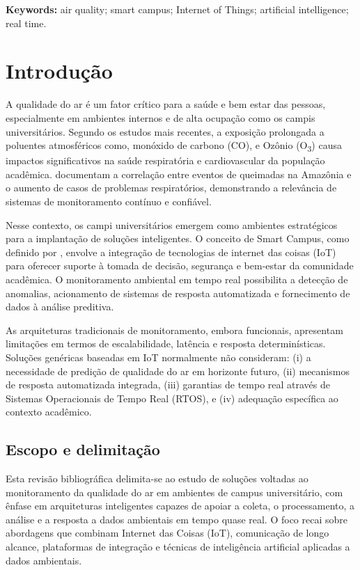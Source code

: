 \documentclass[12pt,a4paper]{article}
\begin{document}
\textbf{Keywords:} air quality; smart campus; Internet of Things; artificial intelligence; real time.

\section{Introdução}

A qualidade do ar é um fator crítico para a saúde e bem estar das pessoas, especialmente em ambientes internos e de alta ocupação como os campis 
universitários. Segundo os estudos mais recentes, a exposição prolongada a poluentes atmosféricos como, monóxido de carbono (CO), e Ozônio (O\textsubscript{3})
causa impactos significativos na saúde respiratória e cardiovascular da população acadêmica. \cite{gomes2024} documentam a correlação entre eventos
de queimadas na Amazônia e o aumento de casos de problemas respiratórios, demonstrando a relevância de sistemas de monitoramento contínuo e confiável.

Nesse contexto, os campi universitários emergem como ambientes estratégicos para a implantação de soluções inteligentes. O conceito de Smart Campus, 
como definido por \cite{minallah2020}, envolve a integração de tecnologias de internet das coisas (IoT) para oferecer suporte à tomada de decisão, segurança e 
bem-estar da comunidade acadêmica. O monitoramento ambiental em tempo real possibilita a detecção de anomalias, acionamento de sistemas de resposta automatizada e fornecimento
de dados à análise preditiva.

As arquiteturas tradicionais de monitoramento, embora funcionais, apresentam limitações em termos de escalabilidade, latência e resposta determinísticas.
Soluções genéricas baseadas em IoT \cite{mokrani2019,kumar2017} normalmente não consideram: (i) a necessidade de predição de qualidade do ar em horizonte futuro, 
(ii) mecanismos de resposta automatizada integrada, (iii) garantias de tempo real através de Sistemas Operacionais de Tempo Real (RTOS), e 
(iv) adequação específica ao contexto acadêmico.

\subsection{Escopo e delimitação}
Esta revisão bibliográfica delimita-se ao estudo de soluções voltadas ao monitoramento da qualidade do ar em ambientes de campus universitário, 
com ênfase em arquiteturas inteligentes capazes de apoiar a coleta, o processamento, a análise e a resposta a dados ambientais em tempo quase real. 
O foco recai sobre abordagens que combinam Internet das Coisas (IoT), comunicação de longo alcance, plataformas de integração e técnicas de 
inteligência artificial aplicadas a dados ambientais.
\end{document}
